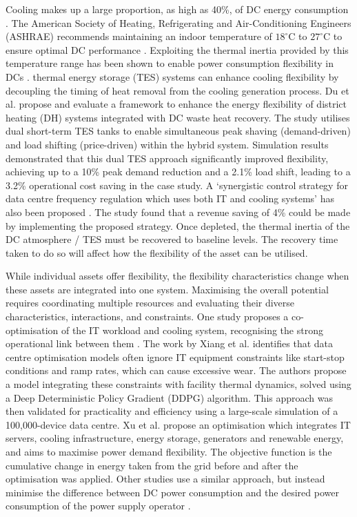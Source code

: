 \documentclass[lettersize,journal]{IEEEtran}
\begin{document}
Cooling makes up a large proportion, as high as 40\%, of DC energy consumption \cite{zhao2021synthetic}. The American Society of Heating, Refrigerating and Air-Conditioning Engineers (ASHRAE) recommends maintaining an indoor temperature of $18^\circ\mathrm{C}$ to $27^\circ\mathrm{C}$ to ensure optimal DC performance \cite{tc2016data}. Exploiting the thermal inertia provided by this temperature range has been shown to enable power consumption flexibility in DCs \cite{takci2025data,ref22}. thermal energy storage (TES) systems can enhance cooling flexibility by decoupling the timing of heat removal from the cooling generation process.
Du et al. \cite{du2025new} propose and evaluate a framework to enhance the energy flexibility of district heating (DH) systems integrated with DC waste heat recovery. The study utilises dual short-term TES tanks to enable simultaneous peak shaving (demand-driven) and load shifting (price-driven) within the hybrid system. Simulation results demonstrated that this dual TES approach significantly improved flexibility, achieving up to a 10\% peak demand reduction and a 2.1\% load shift, leading to a 3.2\% operational cost saving in the case study. A `synergistic control strategy for data centre frequency regulation which uses both IT and cooling systems' has also been proposed \cite{Fu2020ApEn}. The study found that a revenue saving of 4\% could be made by implementing the proposed strategy. Once depleted, the thermal inertia of the DC atmosphere / TES must be recovered to baseline levels. The recovery time taken to do so will affect how the flexibility of the asset can be utilised.


While individual assets offer flexibility, the flexibility characteristics change when these assets are integrated into one system. Maximising the overall potential requires coordinating multiple resources and evaluating their diverse characteristics, interactions, and constraints. One study proposes a co-optimisation of the IT workload and cooling system, recognising the strong operational link between them \cite{Fu2020ApEn}. The work by Xiang et al. \cite{xiang2023modeling} identifies that data centre optimisation models often ignore IT equipment constraints like start-stop conditions and ramp rates, which can cause excessive wear. The authors propose a model integrating these constraints with facility thermal dynamics, solved using a Deep Deterministic Policy Gradient (DDPG) algorithm. This approach was then validated for practicality and efficiency using a large-scale simulation of a 100,000-device data centre.
Xu et al. \cite{Xu2023SPIE} propose an optimisation which integrates IT servers, cooling infrastructure, energy storage, generators and renewable energy, and aims to maximise power demand flexibility. The objective function is the cumulative change in energy taken from the grid before and after the optimisation was applied. 
Other studies use a similar approach, but instead minimise the difference between DC power consumption and the desired power consumption of the power supply operator \cite{cioara2018optimized}. 
\end{document}
